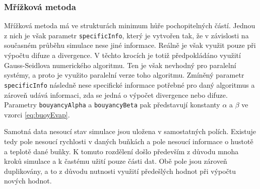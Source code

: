\begin{figure}[h]
	\label{fig:structsSPH}
\end{figure}

\subsubsection{Mřížková metoda}
Mřížková metoda má ve strukturách minimum hůře pochopitelných částí. Jednou z nich je však parametr \texttt{specificInfo}, který je vytvořen tak, že v závislosti na současném průběhu simulace nese jiné informace. Reálně je však využit pouze při výpočtu difuze a divergence. V těchto krocích je totiž předpokládáno využití Gauss-Seidlova numerického algoritmu. Ten je však nevhodný pro paralelní systémy, a proto je využito paralelní verze toho algoritmu. Zmíněný parametr \texttt{specificInfo} následně nese specifické informace potřebné pro daný algoritmus a zároveň udává informaci, zda se jedná o výpočet divergence nebo difuze. Parametry \texttt{bouyancyAlpha} a \texttt{bouyancyBeta} pak představují konstanty $\alpha$ a $\beta$ ve vzorci \ref{eq:buoyEvap}.

Samotná data nesoucí stav simulace jsou uložena v samostatných polích. Existuje tedy pole nesoucí rychlosti v daných buňkách a pole nesoucí informace o hustotě a teplotě dané buňky. K tomuto rozdělení došlo především z důvodu mnoha kroků simulace a k častému užití pouze části dat. Obě pole jsou zároveň duplikovány, a to z důvodu nutnosti využití předešlých hodnot při výpočtu nových hodnot. 

